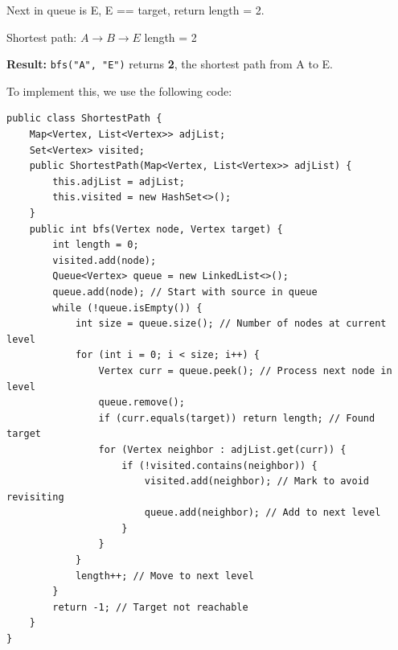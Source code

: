 Next in queue is E, E == target, return length = 2.

\begin{center}

{\small Shortest path: $A \rightarrow B \rightarrow E$ \quad length = 2}
\end{center}

\textbf{Result:} \texttt{bfs("A", "E")} returns \textbf{2}, the shortest path from A to E.

To implement this, we use the following code:

\begin{verbatim}
public class ShortestPath {
    Map<Vertex, List<Vertex>> adjList;
    Set<Vertex> visited;
    public ShortestPath(Map<Vertex, List<Vertex>> adjList) {
        this.adjList = adjList;
        this.visited = new HashSet<>();
    }
    public int bfs(Vertex node, Vertex target) {
        int length = 0;
        visited.add(node);
        Queue<Vertex> queue = new LinkedList<>();
        queue.add(node); // Start with source in queue
        while (!queue.isEmpty()) {
            int size = queue.size(); // Number of nodes at current level
            for (int i = 0; i < size; i++) {
                Vertex curr = queue.peek(); // Process next node in level
                queue.remove();
                if (curr.equals(target)) return length; // Found target
                for (Vertex neighbor : adjList.get(curr)) {
                    if (!visited.contains(neighbor)) {
                        visited.add(neighbor); // Mark to avoid revisiting
                        queue.add(neighbor); // Add to next level
                    }
                }
            }
            length++; // Move to next level
        }
        return -1; // Target not reachable
    }
}
\end{verbatim}


